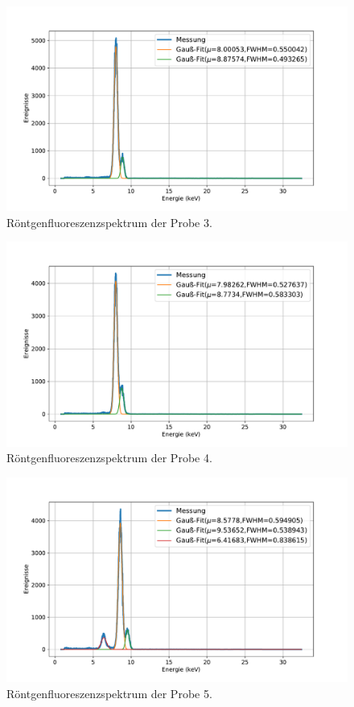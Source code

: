 \documentclass[
	a4paper,
	12pt,
	pagesize,
	ngerman
]{scrartcl}
\begin{document}
	\begin{figure}[H]
		\includegraphics[width=\textwidth]{images/3-Cu.pdf}
		\centering
		\caption{Röntgenfluoreszenzspektrum der Probe 3.}
	\end{figure}

	\begin{figure}[H]
		\includegraphics[width=\textwidth]{images/4-20-Cent.pdf}
		\centering
		\caption{Röntgenfluoreszenzspektrum der Probe 4.}
	\end{figure}

	\begin{figure}[H]
		\includegraphics[width=\textwidth]{images/5-Zn-EdelStahl.pdf}
		\centering
		\caption{Röntgenfluoreszenzspektrum der Probe 5.}
	\end{figure}
\end{document}
